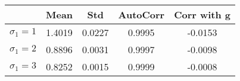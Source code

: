 \begin{tiny}\begin{tabular}{|l|c|c|c|c|}
\hline
&\textbf{Mean}&\textbf{Std}&\textbf{AutoCorr}&\textbf{Corr with g}\\\hline
\textbf{$\sigma_1=1$}&1.4019&0.0227&0.9995&-0.0153\\\hline
\textbf{$\sigma_1=2$}&0.8896&0.0031&0.9997&-0.0098\\\hline
\textbf{$\sigma_1=3$}&0.8252&0.0015&0.9999&-0.0008\\\hline
\end{tabular}
\end{tiny}